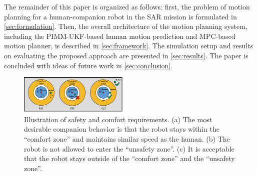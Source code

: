 \documentclass[journal]{IEEEtran}
\newcommand{\todohere}[1]{\hl{(\textbf{TODO:} #1)}}
\DeclareRobustCommand{\grnote}[1]{\ifthenelse{\boolean{include-notes}}%
{\textcolor{purple}{\textbf{GR: #1}}}{}}
\begin{document}
	
	The remainder of this paper is organized as follows:
	first, the problem of motion planning for a human-companion robot in the SAR mission is formulated in \cref{sec:formulation}. 
    Then, the overall architecture of the motion planning system, including the PIMM-UKF-based human motion prediction and MPC-based motion planner, is described in \cref{sec:framework}.
	The simulation setup and results on evaluating the proposed approach are presented in \cref{sec:results}. The paper is concluded with ideas of future work in \cref{sec:conclusion}.
	   
	\begin{figure}
		\centering		
		\includegraphics[width=0.47\textwidth]{figures/zone3}		\caption{Illustration of safety and comfort requirements. (a) The most desirable companion behavior is that the robot stays within the ``comfort zone'' and maintains similar speed as the human. (b) The robot is not allowed to enter the ``unsafety zone''. (c) It is acceptable that the robot stays outside of the ``comfort zone'' and the ``unsafety zone''.}
		\label{fig:zone}
	\end{figure}	
\end{document}
